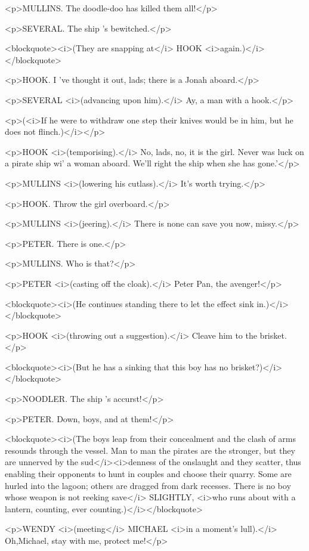 <p>MULLINS. The doodle-doo has killed them all!</p>

<p>SEVERAL. The ship 's bewitched.</p>

<blockquote><i>(They are snapping at</i> HOOK
<i>again.)</i></blockquote>

<p>HOOK. I 've thought it out, lads; there is a Jonah aboard.</p>

<p>SEVERAL <i>(advancing upon him).</i> Ay, a man with a hook.</p>

<p>(<i>If he were to withdraw one step their knives would be in him,
but he does not flinch.)</i></p>

<p>HOOK <i>(temporising).</i> No, lads, no, it is the girl. Never was
luck on a pirate ship wi' a woman aboard. We'll right the ship when
she has gone.'</p>

<p>MULLINS <i>(lowering his cutlass).</i> It's worth trying.</p>

<p>HOOK. Throw the girl overboard.</p>

<p>MULLINS <i>(jeering).</i> There is none can save you now,
missy.</p>

<p>PETER. There is one.</p>

<p>MULLINS. Who is that?</p>

<p>PETER <i>(casting off the cloak).</i> Peter Pan, the avenger!</p>

<blockquote><i>(He continues standing there to let the effect sink
in.)</i></blockquote>

<p>HOOK <i>(throwing out a suggestion).</i> Cleave him to the
brisket.</p>

<blockquote><i>(But he has a sinking that this boy has no
brisket?)</i></blockquote>

<p>NOODLER. The ship 's accurst!</p>

<p>PETER. Down, boys, and at them!</p>

<blockquote><i>(The boys leap from their concealment and the clash of
arms resounds through the vessel. Man to man the pirates are the
stronger, but they are unnerved by the sud</i><i>denness of the
onslaught and they scatter, thus enabling their opponents to hunt in
couples and choose their quarry. Some are hurled into the lagoon;
others are dragged from dark recesses. There is no boy whose weapon
is not reeking save</i> SLIGHTLY, <i>who runs about with a lantern,
counting, ever counting.)</i></blockquote>

<p>WENDY <i>(meeting</i> MICHAEL <i>in a moment's lull).</i>
Oh,Michael, stay with me, protect me!</p>

